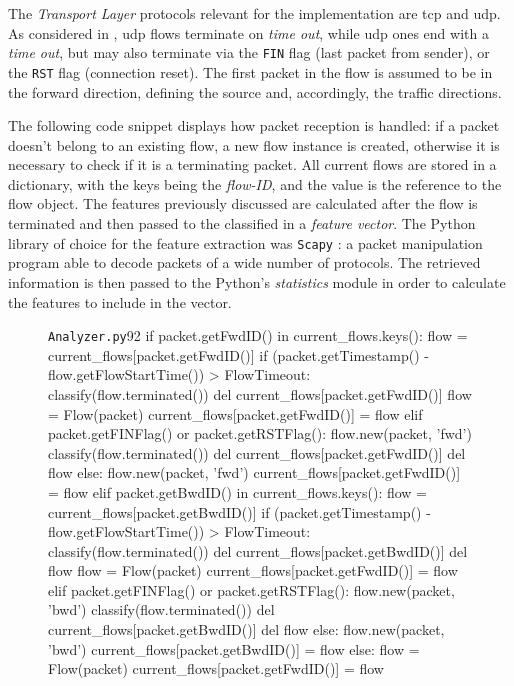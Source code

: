 The \textit{Transport Layer} protocols relevant for the implementation are \gls{tcp} and \gls{udp}. As considered in \cite{Mozley2020}, \gls{udp} flows terminate on \textit{time out}, while \gls{udp} ones end with a \textit{time out}, but may also terminate via the \texttt{FIN} flag (last packet from sender), or the \texttt{RST} flag (connection reset). The first packet in the flow is assumed to be in the forward direction, defining the source and, accordingly, the traffic directions.
\par The following code snippet displays how packet reception is handled: if a packet doesn't belong to an existing flow, a new flow instance is created, otherwise it is necessary to check if it is a terminating packet. All current flows are stored in a dictionary, with the keys being the \textit{flow-ID}, and the value is the reference to the flow object. The features previously discussed are calculated after the flow is terminated and then passed to the classified in a \textit{feature vector}. The Python library of choice for the feature extraction was \texttt{Scapy} \cite{ScapyLibrary}: a packet manipulation program able to decode packets of a wide number of protocols. The retrieved information is then passed to the Python's \textit{statistics} module in order to calculate the features to include in the vector.

\begin{figure}[h!]
    \begin{code}[colback=white]{\texttt{Analyzer.py}}{92}
if packet.getFwdID() in current_flows.keys():
  flow = current_flows[packet.getFwdID()]
  if (packet.getTimestamp() - flow.getFlowStartTime()) > FlowTimeout:
    classify(flow.terminated())
    del current_flows[packet.getFwdID()]
    flow = Flow(packet)
    current_flows[packet.getFwdID()] = flow
  elif packet.getFINFlag() or packet.getRSTFlag():
    flow.new(packet, 'fwd')
    classify(flow.terminated())
    del current_flows[packet.getFwdID()]
    del flow
  else:
    flow.new(packet, 'fwd')
    current_flows[packet.getFwdID()] = flow
elif packet.getBwdID() in current_flows.keys():
  flow = current_flows[packet.getBwdID()]
  if (packet.getTimestamp() - flow.getFlowStartTime()) > FlowTimeout:
    classify(flow.terminated())
    del current_flows[packet.getBwdID()]
    del flow
    flow = Flow(packet)
    current_flows[packet.getFwdID()] = flow
  elif packet.getFINFlag() or packet.getRSTFlag():
    flow.new(packet, 'bwd')
    classify(flow.terminated())
    del current_flows[packet.getBwdID()]
    del flow
  else:
    flow.new(packet, 'bwd')
    current_flows[packet.getBwdID()] = flow
else:
  flow = Flow(packet)
  current_flows[packet.getFwdID()] = flow
    \end{code}
\end{figure}

